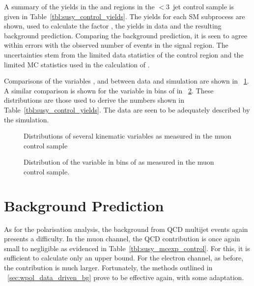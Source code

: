 A summary of the yields in the \LPcontrol and \LPsignal regions in the $<3$~jet
control sample is given in Table~\ref{tbl:susy_control_yields}. The yields for
each \ac{SM} subprocess are shown, used to calculate the factor \RCS, the yields
in data and the resulting background prediction. Comparing the background
prediction, it is seen to agree within errors with the observed number of events
in the signal region. The uncertainties stem from the limited data statistics of
the control region and the limited \ac{MC} statistics used in the calculation of
\RCS.



Comparisons of the variables \STlep, \MT and \Ptmu between data and simulation
are shown in \fig~\ref{fig:susy_mucontrol_kin}. A similar comparison is shown
for the \LP variable in bins of \STlep in
\fig~\ref{fig:susy_mucontrol_lp}. These distributions are those used to derive
the numbers shown in Table~\ref{tbl:susy_control_yields}. The data are seen to
be adequately described by the simulation.
\begin{figure}[h!]
\centering
{}\quad
{}\quad
{}
\caption[]{Distributions of several kinematic variables as measured in the muon control sample}
\label{fig:susy_mucontrol_kin}
\end{figure}

\begin{figure}[h!]
\centering
{}\quad
{}\quad
{}
\caption{Distribution of the \LP variable in bins of \STlep as measured in the muon control sample.}
\label{fig:susy_mucontrol_lp}
\end{figure}

\section{Background Prediction}
As for the \PW polarisation analysis, the background from \ac{QCD} multijet
events again presents a difficulty. In the muon channel, the \ac{QCD}
contribution is once again small to negligible as evidenced in
Table~\ref{tbl:susy_mcexp_control}. For this, it is sufficient to calculate
only an upper bound. For the electron channel, as before, the contribution is
much larger. Fortunately, the methods outlined in
\sec~\ref{sec:wpol_data_driven_bg} prove to be effective again, with some
adaptation.

